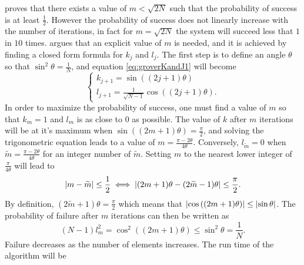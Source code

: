 \documentclass[../../dissertation.tex]{subfiles}
\begin{document}
\cite{grover1996} proves that there exists a value of $m < \sqrt{2N}$ such that
the probability of success is at least $\frac{1}{2}$. However the probability
of success does not linearly increase with the number of iterations, in fact
for $m=\sqrt{2N}$ the system will succeed less that $1$ in $10$ times.
\cite{boyer1996} argues that an explicit value of $m$ is needed, and it is
achieved by finding a closed form formula for $k_j$ and $l_j$. The first step
is to define an angle $\theta$ so that $\sin^2\theta = \frac{1}{N}$, and
equation \ref{eq:groverKandJ1} will become
\begin{equation}
	\begin{cases}
		k_{j+1} = \sin{((2j+1)\theta)} 
		\\l_{j+1} = \frac{1}{\sqrt{N-1}}\cos{((2j+1)\theta)}.
	\end{cases}\label{eq:groverKandJ2}
\end{equation}
In order to maximize the probability of success, one must find a value of $m$
so that $k_m = 1$ and $l_m$ is as close to $0$ as possible. The value of $k$
after $m$ iterations will be at it's maximum when $\sin{((2m+1)\theta)} =
\frac{\pi}{2}$, and solving the trigonometric equation leads to a value of $m =
\frac{\pi-2\theta}{4\theta}$. Conversely, $l_{\widetilde{m}} = 0$ when
$\widetilde{m} = \frac{\pi-2\theta}{4\theta}$ for an integer number of
$\widetilde{m}$. Setting $m$ to the nearest lower integer of
$\frac{\pi}{4\theta}$ will lead to
\begin{equation}
	\abs{m-\widetilde{m}} \leq \frac{1}{2} \iff \abs{(2m+1)\theta - (2\widetilde{m}-1)\theta} \leq \frac{\pi}{2}.
\end{equation}
By definition, $(2\widetilde{m}+1)\theta = \frac{\pi}{2}$ which means that
$\abs{\cos{((2m+1)}\theta)} \leq \abs{\sin{\theta}}$. The probability of
failure after $m$ iterations can then be written as
\begin{equation}
	(N-1)l_m^2 = \cos^2{((2m+1)\theta)} \leq \sin^2\theta = \frac{1}{N}.
\end{equation}
Failure decreases as the number of elements increases. The run time of the algorithm will be
\end{document}
